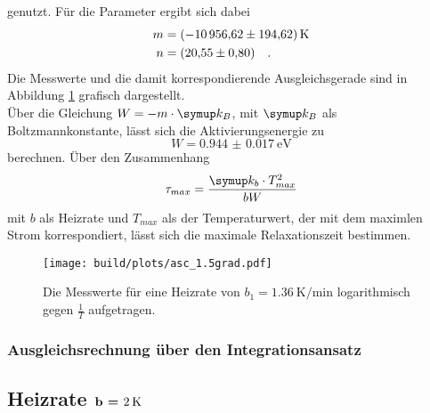 genutzt. Für die Parameter ergibt sich dabei
\begin{align*}
  m & = \SI{-10956.62 (19462)}{\kelvin}\\
  n & = \SI{20.55(080)}{} \quad .
\end{align*}
Die Messwerte und die damit korrespondierende Ausgleichsgerade sind in Abbildung \ref{img:pol15} grafisch dargestellt.\\
Über die Gleichung $W = -m \cdot \I{k_B}$, mit $\I{k_B}$\cite{kb} als Boltzmannkonstante, lässt sich die Aktivierungsenergie zu 
\begin{equation*}
  W = \SI{0.944(0017)}{\electronvolt}
\end{equation*}
berechnen. Über den Zusammenhang
\begin{equation}
  \tau_{max} = \frac{\I{k_b}\cdot T_{max}^2}{b W}
  \label{eqn:taumax}
\end{equation}
mit $b$ als Heizrate und $T_{max}$ als der Temperaturwert, der mit dem maximlen Strom korrespondiert, lässt sich die maximale Relaxationszeit bestimmen.

\begin{figure}[ht]
  \centering
  \texttt{[image: build/plots/asc\_1.5grad.pdf]}
  \caption{Die Messwerte für eine Heizrate von $b_1 = \SI{1.36}{\kelvin\per\minute}$ 
          logarithmisch gegen $\frac{1}{T}$ aufgetragen.}
  \label{img:pol15}
\end{figure}



\subsubsection{Ausgleichsrechnung über den Integrationsansatz}



\subsection{Heizrate $\textbf{b = \SI{2}{\kelvin}}$}


